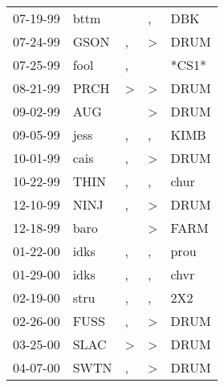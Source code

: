 \begin{supertabular}{p{0.07\textwidth}p{0.06\textwidth}p{0.02\textwidth}p{0.02\textwidth}p{0.06\textwidth}}
 07-19-99\textsuperscript{} &           bttm\textsuperscript{} &               &             , &   DBK\textsuperscript{} \\
 07-24-99\textsuperscript{} &           GSON\textsuperscript{} &             , &  \textgreater &  DRUM\textsuperscript{} \\
 07-25-99\textsuperscript{} &           fool\textsuperscript{} &             , &               &                   *CS1* \\
 08-21-99\textsuperscript{} &           PRCH\textsuperscript{} &  \textgreater &  \textgreater &  DRUM\textsuperscript{} \\
 09-02-99\textsuperscript{} &            AUG\textsuperscript{} &               &  \textgreater &  DRUM\textsuperscript{} \\
 09-05-99\textsuperscript{} &           jess\textsuperscript{} &             , &             , &  KIMB\textsuperscript{} \\
 10-01-99\textsuperscript{} &           cais\textsuperscript{} &             , &  \textgreater &  DRUM\textsuperscript{} \\
 10-22-99\textsuperscript{} &           THIN\textsuperscript{} &             , &             , &  chur\textsuperscript{} \\
 12-10-99\textsuperscript{} &           NINJ\textsuperscript{} &             , &  \textgreater &  DRUM\textsuperscript{} \\
 12-18-99\textsuperscript{} &           baro\textsuperscript{} &               &  \textgreater &  FARM\textsuperscript{} \\
 01-22-00\textsuperscript{} &           idks\textsuperscript{} &             , &             , &  prou\textsuperscript{} \\
 01-29-00\textsuperscript{} &           idks\textsuperscript{} &             , &             , &  chvr\textsuperscript{} \\
 02-19-00\textsuperscript{} &           stru\textsuperscript{} &             , &             , &   2X2\textsuperscript{} \\
 02-26-00\textsuperscript{} &           FUSS\textsuperscript{} &             , &  \textgreater &  DRUM\textsuperscript{} \\
 03-25-00\textsuperscript{} &           SLAC\textsuperscript{} &  \textgreater &  \textgreater &  DRUM\textsuperscript{} \\
 04-07-00\textsuperscript{} &           SWTN\textsuperscript{} &             , &  \textgreater &  DRUM\textsuperscript{} \\

\end{supertabular}
